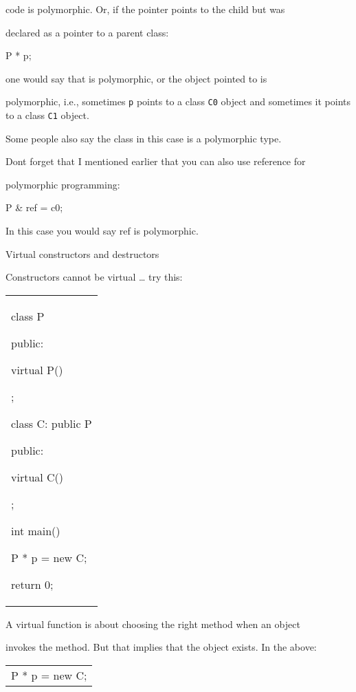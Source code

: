 code is polymorphic. Or, if the pointer points to the child but was

declared as a pointer to a parent class:

P * p;

one would say that is polymorphic, or the object pointed to is

polymorphic, i.e., sometimes \texttt{p} points to a class \texttt{C0} object
and sometimes it points to a class \texttt{C1} object.

Some people also say the class in this case is a polymorphic type.

Don\textquotesingle t forget that I mentioned earlier that you can also
use reference for

polymorphic programming:

P \& ref = c0;

In this case you would say ref is polymorphic.

Virtual constructors and destructors

Constructors cannot be virtual \ldots{} try this:

\begin{longtable}[]{@{}
  >{\raggedright\arraybackslash}p{}@{}}
\toprule\noalign{}
 \\
\midrule\noalign{}
\endhead
\bottomrule\noalign{}
\endlastfoot
class P

{

public:

virtual P() {}

};

class C: public P

{

public:

virtual C() {}

};

int main()

{

P * p = new C;

return 0;

} \\
\end{longtable}

A virtual function is about choosing the right method when an object

invokes the method. But that implies that the object exists. In the
above:

\begin{longtable}[]{@{}l@{}}
\toprule\noalign{}
 \\
\midrule\noalign{}
\endhead
\bottomrule\noalign{}
\endlastfoot
P * p = new C; \\
\end{longtable}

